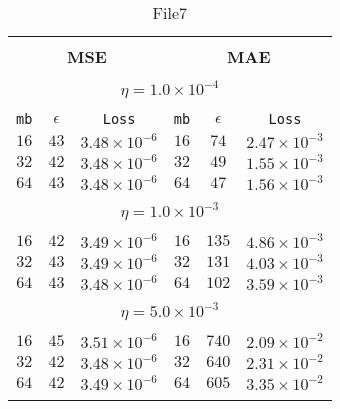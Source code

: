 \begin{table}[]
  \small
  
\begin{center}
\caption{File7}\label{tab:mae2}
\begin{tabular}{@{}ccc|ccc@{}}

\hline\\[-11pt]
\hline\\[-6.5pt]
\multicolumn{3}{c}{\bf MSE} & \multicolumn{3}{c}{\bf MAE } \\[5pt]
\hline\\[-11pt]
\multicolumn{6}{c}{$\eta = 1.0\times 10^{-4}$} \\[5pt]
\hline\\[-11pt]
\texttt{mb} & \texttt{$\epsilon$} & \texttt{Loss} & \texttt{mb} & \texttt{$\epsilon$} & \texttt{Loss} \\[1pt]
$16$ & $43$ & $3.48\times 10^{-6}$  &   $16$ & $74$ & $2.47\times 10^{-3}$   \\ [1pt]
$32$ & $42$ & $3.48\times 10^{-6}$  &   $32$ & $49$ & $1.55\times 10^{-3}$   \\ [1pt]
$64$ & $43$ & $3.48\times 10^{-6}$  &   $64$ & $47$ & $1.56\times 10^{-3}$   \\ [1pt]

\hline\\[-11pt]
\multicolumn{6}{c}{$\eta = 1.0\times 10^{-3}$} \\[5pt]
\hline\\[-11pt]
$16$ & $42$ & $3.49\times 10^{-6}$  &   $16$ & $135$ & $4.86\times 10^{-3}$  \\ [1pt]
$32$ & $43$ & $3.49\times 10^{-6}$  &   $32$ & $131$ & $4.03\times 10^{-3}$  \\ [1pt]
$64$ & $43$ & $3.48\times 10^{-6}$  &   $64$ & $102$ & $3.59\times 10^{-3}$  \\ [1pt]
\hline\\[-11pt]
\multicolumn{6}{c}{$\eta = 5.0\times 10^{-3}$} \\[5pt]
\hline\\[-11pt]
$16$ & $45$ & $3.51\times 10^{-6}$  &   $16$ & $740$ & $2.09\times 10^{-2}$  \\ [1pt]
$32$ & $42$ & $3.48\times 10^{-6}$  &   $32$ & $640$ & $2.31\times 10^{-2}$  \\ [1pt]
$64$ & $42$ & $3.49\times 10^{-6}$  &   $64$ & $605$ & $3.35\times 10^{-2}$  \\ [1pt]

\hline\\[-11pt]


\end{tabular}
\end{center}
\end{table}
